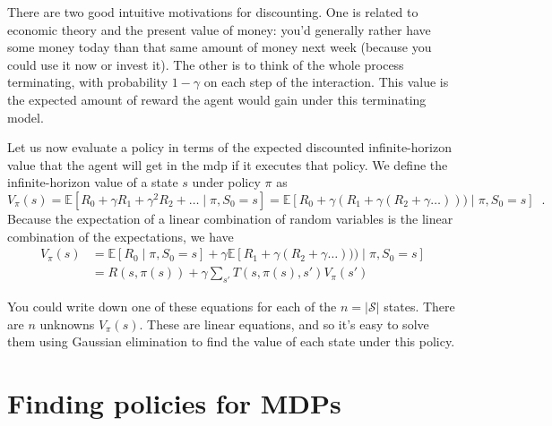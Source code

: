 There are two good intuitive motivations for discounting.  One is
related to economic theory and the present value of money:   you'd
generally  rather have some money today than that same amount of money
next week (because you could use it now or invest it).  The other is
to think of the whole process  terminating, with probability
$1-\gamma$  on  each step of the interaction.    This  value  is the
expected amount of reward the  agent  would gain under  this
terminating model.

Let us now evaluate a policy in terms of the expected discounted
infinite-horizon value that the agent will get in the {\sc mdp} if it
executes that policy.  We define the infinite-horizon value of a state
$s$ under policy $\pi$ as
\begin{equation}
 V_{\pi}(s) = \mathbb{E}[R_0 + \gamma R_1 + \gamma^2 R_2 +
\dots \mid \pi, S_0 = s] = \mathbb{E}[R_0 + \gamma(R_1 + \gamma(R_2 + \gamma
\dots))) \mid \pi, S_0 = s] \;\;.
\end{equation}
Because the expectation of a linear combination of random variables is
the linear combination of the expectations, we have
\begin{align}
V_{\pi}(s) & = \mathbb{E}[R_0 \mid \pi, S_0 = s] + \gamma  \mathbb{E}[
R_1 + \gamma(R_2 + \gamma \dots))) \mid \pi, S_0 = s] 
\nonumber
\\
         & = R(s, \pi(s)) + \gamma\sum_{s'}T(s, \pi(s), s')V_{\pi}(s')
\label{eq:inifite_horiz_value}
\end{align}

You could write down one of these equations for each of the $n =
|\mathcal  S|$ states. There are $n$ unknowns $V_{\pi}(s)$.  These
are linear equations,  and  so it's  easy  to solve them using
Gaussian elimination to find the value of each state under this
policy.

\section{Finding policies for MDPs}

\label{sec:finding_mdp_policies}

